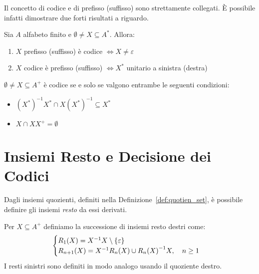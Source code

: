 Il concetto di codice e di prefisso (suffisso) sono strettamente collegati.
È possibile infatti dimostrare due forti risultati a riguardo.
\begin{theorem}
  Sia \(A\) alfabeto finito e \(\emptyset \neq X \subseteq A^*\).
  Allora:
  \begin{enumerate}
    \item \(X\) prefisso (suffisso) è codice \(\iff X \neq {\varepsilon}\)
    \item \(X\) codice è prefisso (suffisso) \(\iff X^*\) unitario a sinistra (destra)
  \end{enumerate}
\end{theorem}

\begin{corollary}
  \(\emptyset \neq X \subseteq A^+\) è codice se e solo se valgono entrambe le seguenti condizioni:
  \begin{itemize}
    \item \({(X^*)}^{-1}X^* \cap X{(X^*)}^{-1} \subseteq X^* \)
    \item \(X \cap XX^+ = \emptyset\)
  \end{itemize}
\end{corollary}

\section{Insiemi Resto e Decisione dei Codici}

Dagli insiemi quozienti, definiti nella Definizione~\ref{def:quotien_set}, è possibile definire gli insiemi \emph{resto} da essi derivati.
\begin{definition}
  Per \(X \subseteq A^+\) definiamo la successione di insiemi resto destri come:
  \begin{equation}
    \begin{cases}
      R_1(X) = X^{-1}X\setminus \set{\varepsilon} \\
      R_{n+1}(X) =X^{-1} R_n(X) \cup {R_n(X)}^{-1}X, \quad n \geq 1\\
    \end{cases}
  \end{equation}
  I resti sinistri sono definiti in modo analogo usando il quoziente destro.
\end{definition}

